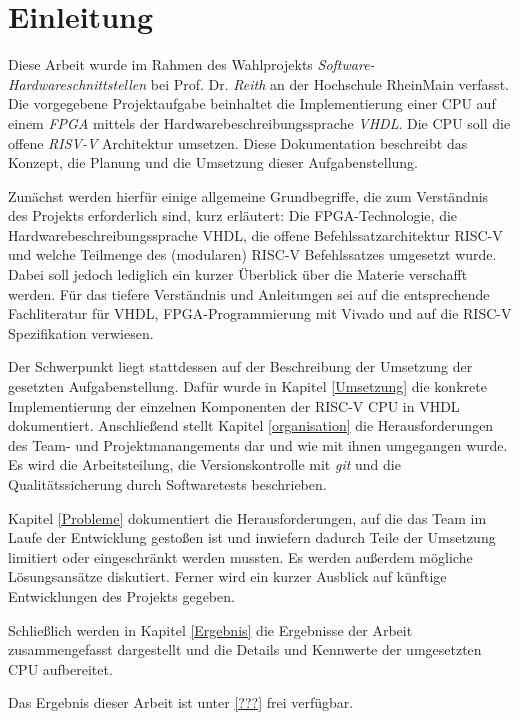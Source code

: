 \chapter{Einleitung} %
\label{Einleitung} %


\newcommand{\keyword}[1]{\textbf{#1}}
\newcommand{\tabhead}[1]{\textbf{#1}}
\newcommand{\code}[1]{\texttt{#1}}
\newcommand{\file}[1]{\texttt{\bfseries#1}}
\newcommand{\option}[1]{\itshape#1}

Diese Arbeit wurde im Rahmen des Wahlprojekts \textit{Software- Hardwareschnittstellen} bei Prof. Dr. \emph{Reith} an der Hochschule RheinMain verfasst. Die vorgegebene Projektaufgabe beinhaltet die Implementierung einer CPU auf einem \emph{FPGA} mittels der Hardwarebeschreibungssprache \emph{VHDL}. Die CPU soll die offene \emph{RISV-V} Architektur umsetzen. Diese Dokumentation beschreibt das Konzept, die Planung und die Umsetzung dieser Aufgabenstellung.

Zunächst werden hierfür einige allgemeine Grundbegriffe, die zum Verständnis des Projekts erforderlich sind, kurz erläutert: Die FPGA-Technologie, die Hardwarebeschreibungssprache VHDL, die offene Befehlssatzarchitektur RISC-V und welche Teilmenge des (modularen) RISC-V Befehlssatzes umgesetzt wurde. Dabei soll jedoch lediglich ein kurzer Überblick über die Materie verschafft werden. Für das tiefere Verständnis und Anleitungen sei auf die entsprechende Fachliteratur für VHDL\citep{Ashenden:609207}, FPGA-Programmierung\cite{Chu} mit Vivado\cite{churiwala} und auf die RISC-V Spezifikation\citep{RISC} verwiesen.

Der Schwerpunkt liegt stattdessen auf der Beschreibung der Umsetzung der gesetzten Aufgabenstellung. Dafür wurde in Kapitel \ref{Umsetzung} die konkrete Implementierung der einzelnen Komponenten der RISC-V CPU in VHDL dokumentiert. Anschließend stellt Kapitel \ref{organisation} die Herausforderungen des Team- und Projektmanangements dar und wie mit ihnen umgegangen wurde. Es wird die Arbeitsteilung, die Versionskontrolle mit \emph{git} und die Qualitätssicherung durch Softwaretests beschrieben.

Kapitel \ref{Probleme} dokumentiert die Herausforderungen, auf die das Team im Laufe der Entwicklung gestoßen ist und inwiefern dadurch Teile der Umsetzung limitiert oder eingeschränkt werden mussten. Es werden außerdem mögliche Lösungsansätze diskutiert. Ferner wird ein kurzer Ausblick auf künftige Entwicklungen des Projekts gegeben.

Schließlich werden in Kapitel \ref{Ergebnis} die Ergebnisse der Arbeit zusammengefasst dargestellt und die Details und Kennwerte der umgesetzten CPU aufbereitet. 

Das Ergebnis dieser Arbeit ist unter \ref{???} frei verfügbar.
